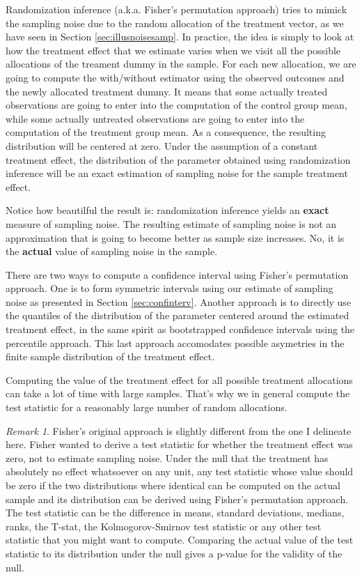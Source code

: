 \documentclass[
]{book}
\theoremstyle{definition}
\theoremstyle{definition}
\theoremstyle{definition}
\theoremstyle{definition}
\theoremstyle{remark}
\newtheorem*{remark}{Remark}
\begin{document}
Randomization inference (a.k.a. Fisher's permutation approach) tries to mimick the sampling noise due to the random allocation of the treatment vector, as we have seen in Section \ref{sec:illusnoisesamp}.
In practice, the idea is simply to look at how the treatment effect that we estimate varies when we visit all the possible allocations of the treament dummy in the sample.
For each new allocation, we are going to compute the with/without estimator using the observed outcomes and the newly allocated treatment dummy.
It means that some actually treated observations are going to enter into the computation of the control group mean, while some actually untreated observations are going to enter into the computation of the treatment group mean.
As a consequence, the resulting distribution will be centered at zero.
Under the assumption of a constant treatment effect, the distribution of the parameter obtained using randomization inference will be an exact estimation of sampling noise for the sample treatment effect.

Notice how beautilful the result is: randomization inference yields an \textbf{exact} measure of sampling noise.
The resulting estimate of sampling noise is not an approximation that is going to become better as sample size increases.
No, it is the \textbf{actual} value of sampling noise in the sample.

There are two ways to compute a confidence interval using Fisher's permutation approach.
One is to form symmetric intervals using our estimate of sampling noise as presented in Section \ref{sec:confinterv}.
Another approach is to directly use the quantiles of the distribution of the parameter centered around the estimated treatment effect, in the same spirit as bootstrapped confidence intervals using the percentile approach.
This last approach accomodates possible asymetries in the finite sample distribution of the treatment effect.

Computing the value of the treatment effect for all possible treatment allocations can take a lot of time with large samples.
That's why we in general compute the test statistic for a reasonably large number of random allocations.

\begin{remark}
\iffalse{} {Remark. } \fi{}Fisher's original approach is slightly different from the one I delineate here.
Fisher wanted to derive a test statistic for whether the treatment effect was zero, not to estimate sampling noise.
Under the null that the treatment has absolutely no effect whatsoever on any unit, any test statistic whose value should be zero if the two distributions where identical can be computed on the actual sample and its distribution can be derived using Fisher's permutation approach.
The test statistic can be the difference in means, standard deviations, medians, ranks, the T-stat, the Kolmogorov-Smirnov test statistic or any other test statistic that you might want to compute.
Comparing the actual value of the test statistic to its distribution under the null gives a p-value for the validity of the null.
\end{remark}
\end{document}
